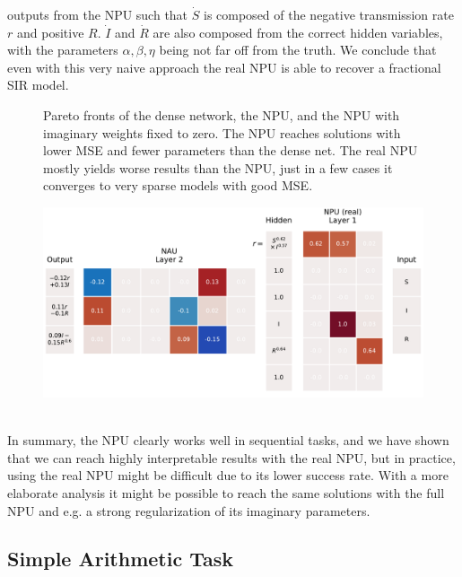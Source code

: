 \documentclass[9pt]{article}
\begin{document}
outputs from the NPU such that $\dot S$ is composed of the negative
transmission rate $r$ and positive $R$.  $\dot I$ and $\dot R$ are also
composed from the correct hidden variables, with the parameters
$\alpha,\beta,\eta$ being not far off from the truth.
We conclude that even with this very naive approach the real NPU is able to
recover a fractional SIR model.
\begin{figure}
  \centering
  \resizebox{.7\textwidth}{!}{}
  \caption{Pareto fronts of the dense network, the NPU, and the NPU
  with imaginary weights fixed to zero. The NPU reaches solutions with lower
  MSE and fewer parameters than the dense net. The real NPU mostly yields
  worse results than the NPU, just in a few cases it converges to very sparse
  models with good MSE.}%
  \label{fig:pareto_sir}
\end{figure}
\begin{figure}
  \centering
  \includegraphics[width=.6\linewidth]{../plots/sir_gatednpu_modelps.pdf}
  \label{fig:sir_gatednpu_modelps}
\end{figure}
\\
In summary, the NPU clearly works well in sequential tasks, and we have shown
that we can reach highly interpretable results with the real NPU, but in practice,
using the real NPU might be difficult due to its lower success rate. With a more
elaborate analysis it might be possible to reach the same solutions with the
full NPU and e.g. a strong regularization of its imaginary parameters.


\subsection{Simple Arithmetic Task}%
\label{sub:simple_arithmetic_task}
\end{document}
